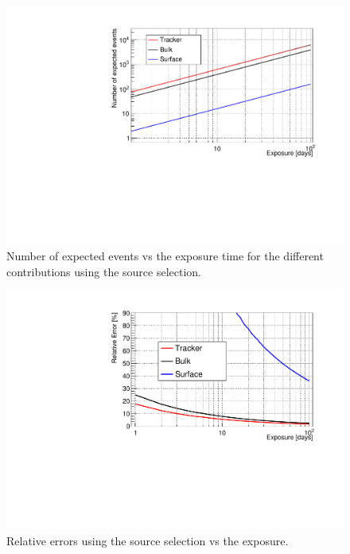 \documentclass[main.tex]{subfiles}
\begin{document}
\begin{figure}[h!]
\begin{center}
\includegraphics[scale=0.6]{pictures/Chap5/nexpected_source_selection.pdf}
\caption{Number of expected events vs the exposure time for the different contributions using the source selection.}
\label{picture_number_of_expected_events_source_selection}
\end{center}
\end{figure}


\begin{figure}[h!]
\begin{center}
\includegraphics[scale=0.6]{pictures/Chap5/n_source_selection_last_results.pdf}
\caption{Relative errors using the source selection vs the exposure.}
\label{picture_relative_error_source_selection}
\end{center}
\end{figure}
\end{document}

